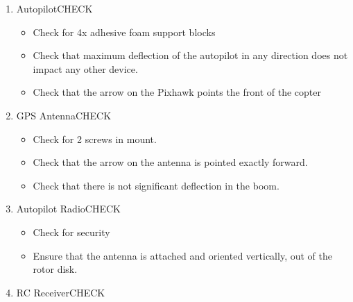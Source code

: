 \documentclass{report}
\begin{document}
\begin{enumerate}
\begin{enumerate}
\begin{enumerate}
\begin{itemize}
									\item Check for cracks, excess abrasion
								\end{itemize}
							\item 2x Battery Boom\hrulefill CHECK
								\begin{itemize}
									\item Check for proper interfacing with 2x grommets on clamps
									\item Check for cracks, nicks, flexing, and other defects
								\end{itemize}
							\item 2x Battery Straps\hrulefill CHECK
								\begin{itemize}
									\item Check for presence
									\item Check for 40 cm length
								\end{itemize}
						\end{enumerate}
				\end{enumerate}
			\item Autopilot\hrulefill CHECK
				\begin{itemize}
					\item Check for 4x adhesive foam support blocks
					\item Check that maximum deflection of the autopilot in any direction does not impact any other device.
					\item Check that the arrow on the Pixhawk points the front of the copter
				\end{itemize}
			\item GPS Antenna\hrulefill CHECK
				\begin{itemize}
					\item Check for 2 screws in mount.
					\item Check that the arrow on the antenna is pointed exactly forward.
					\item Check that there is not significant deflection in the boom.
				\end{itemize}
			\item Autopilot Radio\hrulefill CHECK
				\begin{itemize}
					\item Check for security
					\item Ensure that the antenna is attached and oriented vertically, out of the rotor disk.
				\end{itemize}
			\item RC Receiver\hrulefill CHECK

\end{enumerate}
\end{document}
